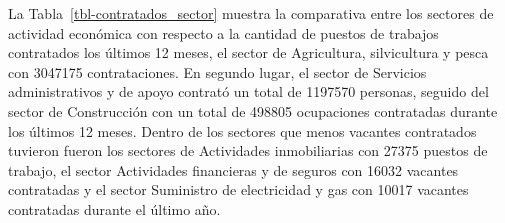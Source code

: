 \documentclass[
  11pt,
]{article}
\begin{document}
\begin{table}

\caption{\label{tbl-contratados_u12}Contratados últimos 12 meses, por
ocupación.}


\end{table}%

\FloatBarrier

La Tabla~\ref{tbl-contratados_sector} muestra la comparativa entre los
sectores de actividad económica con respecto a la cantidad de puestos de
trabajos contratados los últimos 12 meses, el sector de Agricultura,
silvicultura y pesca con 3047175 contrataciones. En segundo lugar, el
sector de Servicios administrativos y de apoyo contrató un total de
1197570 personas, seguido del sector de Construcción con un total de
498805 ocupaciones contratadas durante los últimos 12 meses. Dentro de
los sectores que menos vacantes contratados tuvieron fueron los sectores
de Actividades inmobiliarias con 27375 puestos de trabajo, el sector
Actividades financieras y de seguros con 16032 vacantes contratadas y el
sector Suministro de electricidad y gas con 10017 vacantes contratadas
durante el último año.
\end{document}

